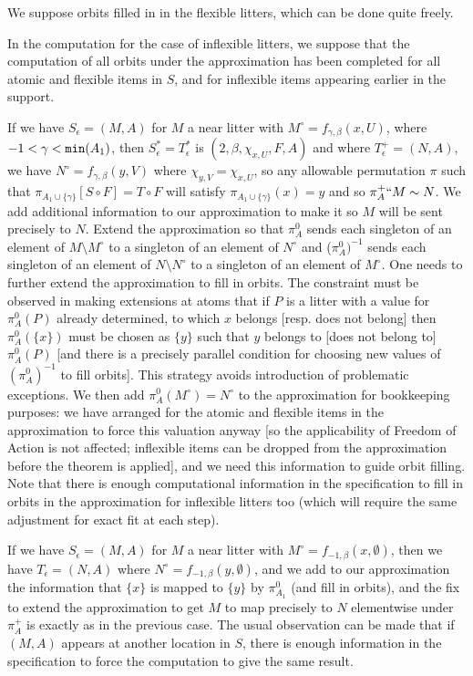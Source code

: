 \documentclass[112pt]{article}
\begin{document}
\begin{description}
We suppose orbits filled in in the flexible litters, which can be done quite freely.

In the computation for the case of inflexible litters, we suppose that the computation of all orbits under the approximation has been completed for all atomic and flexible items in $S$, and for inflexible items appearing earlier in the support.

If we have $S_\epsilon= (M,A)$ for $M$ a near litter with $M^\circ = f_{\gamma,\beta}(x,U)$, where $-1<\gamma<{\tt min}(A_1)$,
then $S^*_\epsilon=T^*_\epsilon$ is $(2,\beta,\chi_{x,U}, F,A)$ and where $T^+_\epsilon=(N,A)$,  we have $N^\circ = f_{\gamma,\beta}(y,V)$
where $\chi_{y,V} = \chi_{x,U}$, so any allowable permutation $\pi$ such that $\pi_{A_1 \cup \{\gamma\}}[S \circ F] = T \circ F$ will satisfy $\pi_{A_1 \cup \{\gamma\}}(x) = y$ and  so $\pi^+_A``M \sim N$.
We add additional information to our approximation to make it so $M$ will be sent precisely to $N$.
Extend the approximation so that $\pi^0_{A}$ sends each singleton of an element of $M\setminus M^\circ$ to a singleton of an element of $N^\circ$ and ($\pi^0_A)^{-1}$ sends each singleton of an element of $N\setminus N^\circ$ to a singleton of an  element of $M^\circ$.  One needs to further extend the approximation to fill in orbits.  The constraint must be observed in making extensions at atoms  that if $P$ is a litter with a value for
$\pi^0_A(P)$ already determined, to which $x$ belongs [resp. does not belong] then $\pi^0_A(\{x\})$ must be chosen as $\{y\}$ such that
$y$ belongs to [does not belong to] $\pi^0_A(P)$ [and there is a precisely parallel condition for choosing new values of $(\pi^0_A)^{-1}$ to fill orbits].  This strategy avoids introduction of problematic exceptions.  We then add $\pi^0_A(M^\circ) = N^\circ$ to the approximation for bookkeeping purposes:  we have arranged for the atomic and flexible items in the approximation to force this valuation anyway [so the applicability of Freedom of Action is not affected; inflexible items can be dropped from the approximation before the theorem  is applied], and we need this information to guide orbit filling.
Note that there is enough computational information in the specification to fill in orbits in the approximation for inflexible litters too (which will require the same adjustment for exact fit at each step).

If we have $S_\epsilon= (M,A)$ for $M$ a near litter with $M^\circ = f_{-1,\beta}(x,\emptyset)$, then we have $T_\epsilon=(N,A)$
where  $N^\circ = f_{-1,\beta}(y,\emptyset)$, and we add to our approximation the information that $\{x\}$ is mapped to 
$\{y\}$ by $\pi^0_{A_1}$ (and fill in orbits), and the fix to extend the approximation to get $M$ to map precisely to $N$ elementwise under $\pi^+_A$ is exactly as in the previous case.  The usual observation can be made that if $(M,A)$ appears at another location in $S$, there is enough information in the specification to force the computation to give the same result.


\end{description}
\end{document}
